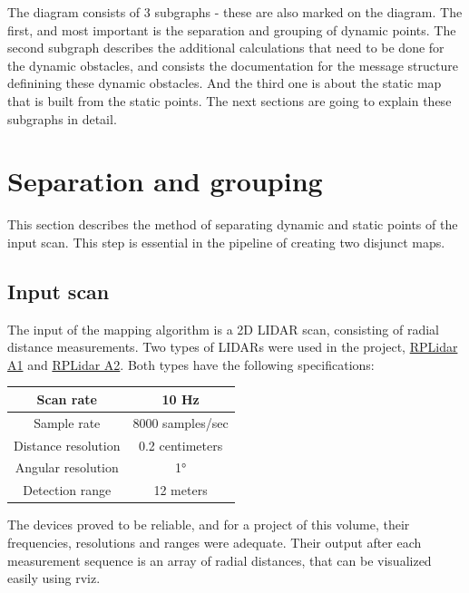 The diagram consists of 3 subgraphs - these are also marked on the diagram. The first, and most important is the separation and grouping of dynamic points. The second subgraph describes the additional calculations that need to be done for the dynamic obstacles, and consists the documentation for the message structure definining these dynamic obstacles. And the third one is about the static map that is built from the static points. The next sections are going to explain these subgraphs in detail.

\section{Separation and grouping}
\label{chap:separation_and_grouping}
This section describes the method of separating dynamic and static points of the input scan. This step is essential in the pipeline of creating two disjunct maps.

\subsection{Input scan}
The input of the mapping algorithm is a 2D LIDAR scan, consisting of radial distance measurements. Two types of LIDARs were used in the project, \href{http://www.slamtec.com/en/lidar/a1}{RPLidar A1} and \href{http://www.slamtec.com/en/lidar/a2}{RPLidar A2}.
Both types have the following specifications:

\begin{center}
    \begin{tabular}{ | c | c | }
        \hline
        Scan rate           & 10 Hz            \\
        \hline
        Sample rate         & 8000 samples/sec \\
        \hline 
        Distance resolution & 0.2 centimeters  \\
        \hline 
        Angular resolution  & 1°               \\
        \hline 
        Detection range     & 12 meters        \\
        \hline
    \end{tabular}
\end{center}

The devices proved to be reliable, and for a project of this volume, their frequencies, resolutions and ranges were adequate. Their output after each measurement sequence is an array of radial distances, that can be visualized easily using rviz.

